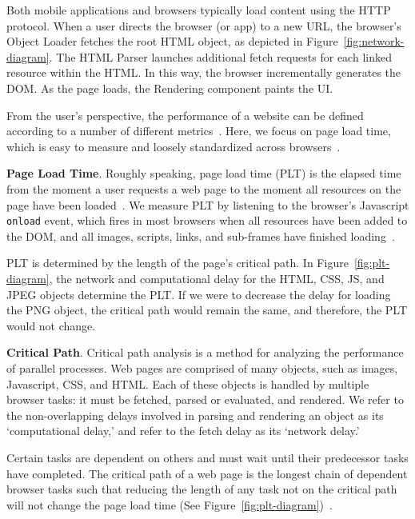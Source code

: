 Both mobile applications and browsers typically load content using the HTTP protocol. When a user directs the browser (or app) to a new URL, the browser's Object Loader fetches the root HTML object, as depicted
in Figure~\ref{fig:network-diagram}. The HTML Parser launches additional
fetch requests for each linked resource within the HTML. In this way, the browser incrementally generates the DOM.
As the page loads, the Rendering component paints the UI.

From the user's perspective, the performance of a website can be defined according to a number of different metrics~\cite{above-the-fold,speed-index}. Here,
we focus on page load time, which is easy to measure
and loosely standardized across browsers~\cite{w3c-onload}.

\textbf{Page Load Time}. Roughly speaking, page load time (PLT) is the elapsed time from the moment a user requests a web page to the moment all resources on the page have been loaded~\cite{page-speed}.
We measure PLT by listening to the browser's Javascript \texttt{onload} event,
which fires in most browsers when all resources have been added to the DOM, and all images,
scripts, links, and sub-frames have finished loading~\cite{w3c-onload}.

PLT is determined by the length of the page's critical path. In
Figure~\ref{fig:plt-diagram}, the network and computational delay for the HTML, CSS, JS, and JPEG
objects determine the PLT. If we were to decrease the delay for loading the
PNG object, the critical path would remain the same, and therefore, the PLT would not change.



\textbf{Critical Path}. Critical path analysis is a method for analyzing the performance of parallel processes. Web pages are comprised of many objects, such as images, Javascript, CSS, and HTML.
Each of these objects is handled by multiple browser tasks: it must be
fetched, parsed or evaluated, and rendered. We refer to the non-overlapping
delays involved in parsing and rendering an object as its `computational
delay,' and refer to the fetch delay as its `network delay.'

Certain tasks are dependent on others and must wait until their
predecessor tasks have completed. The critical path of a web page is the longest chain of dependent browser tasks such that reducing the length of any task not on the critical
path will not change the page load time (See Figure~\ref{fig:plt-diagram})~\cite{sarkar1987partitioning}.

